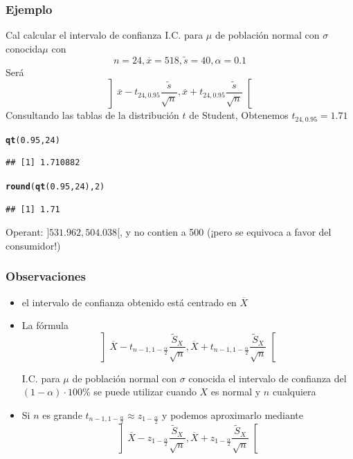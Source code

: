 \documentclass[12pt,t]{beamer}\usepackage[]{graphicx}\usepackage[]{color}
\makeatletter
\newcommand{\hlnum}[1]{\textcolor[rgb]{0.686,0.059,0.569}{#1}}%
\newcommand{\hlstd}[1]{\textcolor[rgb]{0.345,0.345,0.345}{#1}}%
\newcommand{\hlkwd}[1]{\textcolor[rgb]{0.737,0.353,0.396}{\textbf{#1}}}%
\newenvironment{kframe}{%
 \def\at@end@of@kframe{}%
 \ifinner\ifhmode%
  \def\at@end@of@kframe{\end{minipage}}%
  \begin{minipage}{\columnwidth}%
 \fi\fi%
 \def\FrameCommand##1{\hskip\@totalleftmargin \hskip-\fboxsep
 \colorbox{shadecolor}{##1}\hskip-\fboxsep
     \hskip-\linewidth \hskip-\@totalleftmargin \hskip\columnwidth}%
 \MakeFramed {\advance\hsize-\width
   \@totalleftmargin\z@ \linewidth\hsize
   \@setminipage}}%
 {\par\unskip\endMakeFramed%
 \at@end@of@kframe}
\newenvironment{knitrout}{}{} %
\renewcommand{\emph}[1]{{\color{red}#1}}
\theoremstyle{plain}
\theoremstyle{definition}
\makeatother
\begin{document}
\begin{frame}[fragile]
\frametitle{Ejemplo}
Cal calcular el intervalo de confianza  I.C. para $\mu$ de población normal con $\sigma$ conocida$\mu$ con 
$$
n=24, \overline{x}=518, \widetilde{s}=40, \alpha=0.1
$$
Será
$$
\left] 
\overline{x}-t_{24,0.95} \frac{\widetilde{s}}{\sqrt{n}},
\overline{x}+t_{24,0.95} \frac{\widetilde{s}}{\sqrt{n}}\right[
$$
Consultando las tablas de la distribución  $t$ de Student, Obtenemos $t_{24,0.95}=1.71$

\begin{knitrout}\small
{}\color{fgcolor}\begin{kframe}
\begin{alltt}
\hlkwd{qt}\hlstd{(}\hlnum{0.95}\hlstd{,}\hlnum{24}\hlstd{)}
\end{alltt}
\begin{verbatim}
## [1] 1.710882
\end{verbatim}
\begin{alltt}
\hlkwd{round}\hlstd{(}\hlkwd{qt}\hlstd{(}\hlnum{0.95}\hlstd{,}\hlnum{24}\hlstd{),}\hlnum{2}\hlstd{)}
\end{alltt}
\begin{verbatim}
## [1] 1.71
\end{verbatim}
\end{kframe}
\end{knitrout}




Operant: $]531.962,504.038[$, y no contien a 500 (¡pero se equivoca a favor del consumidor!)
\end{frame}

\begin{frame}
\frametitle{Observaciones }

\begin{itemize}
\item el intervalo de confianza  obtenido  está centrado   en $\overline{X}$
\medskip

\item La fórmula
$$
\left] 
\overline{X}-t_{n-1,1-\frac{\alpha}{2}} \frac{\widetilde{S}_{X}}{\sqrt{n}},
\overline{X}+t_{n-1,1-\frac{\alpha}{2}}\frac{\widetilde{S}_{X}}{\sqrt{n}} \right[
$$

I.C. para $\mu$ de población normal con $\sigma$ conocida el   intervalo de confianza  del $(1-\alpha)\cdot 100\%$ se  puede utilizar  cuando $X$ es normal y $n$ cualquiera
\bigskip

\item Si $n$ es grande $t_{n-1,1-\frac{\alpha}{2}}\approx z_{1-\frac{\alpha}{2}}$ y podemos \emph{aproximarlo}  mediante
$$
\left] 
\overline{X}-z_{1-\frac{\alpha}{2}} \frac{\widetilde{S}_{X}}{\sqrt{n}},
\overline{X}+z_{1-\frac{\alpha}{2}}\frac{\widetilde{S}_{X}}{\sqrt{n}} \right[
$$
\end{itemize}


\end{frame}
\end{document}
